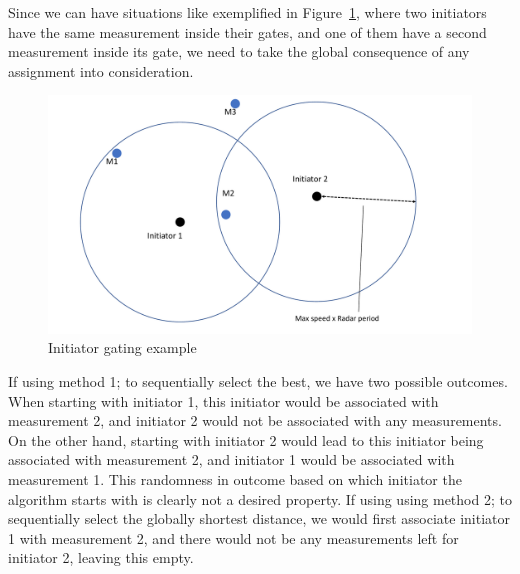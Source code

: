 Since we can have situations like exemplified in Figure~\ref{fig:init_gating}, where two initiators have the same measurement inside their gates, and one of them have a second measurement inside its gate, we need to take the global consequence of any assignment into consideration.
\begin{figure}
\centering
\includegraphics[width = .8\textwidth]{Figures/init_gating.pdf}
\caption{Initiator gating example}\label{fig:init_gating}
\end{figure}
If using method 1; to sequentially select the best, we have two possible outcomes. When starting with initiator 1, this initiator would be associated with measurement 2, and initiator 2 would not be associated with any measurements. On the other hand, starting with initiator 2 would lead to this initiator being associated with measurement 2, and initiator 1 would be associated with measurement 1. This randomness in outcome based on which initiator the algorithm starts with is clearly not a desired property. If using using method 2; to sequentially select the globally shortest distance, we would first associate initiator 1 with measurement 2, and there would not be any measurements left for initiator 2, leaving this empty.

